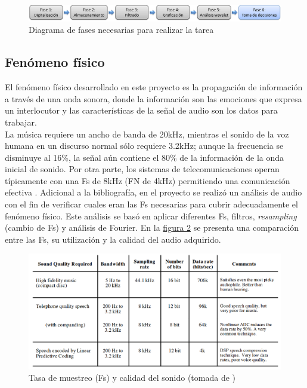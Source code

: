 \documentclass[11pt,lettersize]{article} %
\newcommand{\figura}[1]{\hyperref[{#1}]{figura \ref*{#1}}}
\begin{document}
\begin{figure}[h!]
	\centering
	\includegraphics[width=1\textwidth]{images/diagrama-fases.png}
	\caption{Diagrama de fases necesarias para realizar la tarea}
	\label{F-diagrama-fases}
\end{figure}


\subsection{Fenómeno físico}
El fenómeno físico desarrollado en este proyecto es la propagación de información a través de una onda sonora, donde la información son las emociones que expresa un interlocutor y las características de la señal de audio son los datos para trabajar.\\

La música requiere un ancho de banda de 20kHz, mientras el sonido de la voz humana en un discurso normal sólo requiere 3.2kHz; aunque la frecuencia se disminuye al 16\%, la señal aún contiene el 80\% de la información de la onda inicial de sonido. Por otra parte, los sistemas de telecomunicaciones operan típicamente con una Fs de 8kHz (FN de 4kHz) permitiendo una comunicación efectiva \cite{Smith1997}. Adicional a la bibliografía, en el proyecto se realizó un análisis de audio con el fin de verificar cuales eran las Fs necesarias para cubrir adecuadamente el fenómeno físico. Este análisis se basó en aplicar diferentes Fs, filtros, \textit{resampling} (cambio de Fs) y análisis de Fourier. En la \figura{F-rate-quality} se presenta una comparación entre las Fs, su utilización y la calidad del audio adquirido.
\begin{figure}[H]
	\centering
	\includegraphics[width=1\textwidth]{images/rate-quality.png}
	\caption[Tasa de muestreo (Fs) y calidad del sonido]{Tasa de muestreo (Fs) y calidad del sonido (tomada de \cite{Smith1997})}
	\label{F-rate-quality}
\end{figure}
\end{document}
